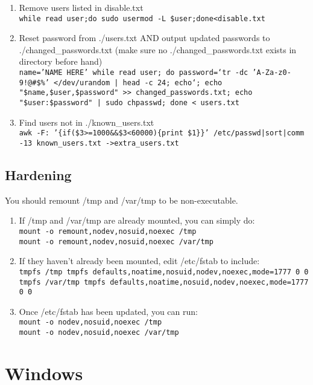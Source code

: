 \documentclass[12pt,letterpaper]{article}
\def\code#1{\textcolor{iris}{\texttt{#1}}}
\begin{document}
\begin{enumerate}
	\item Remove users listed in disable.txt \\
		\code{while read user;do sudo usermod -L \$user;done<disable.txt}
	\item Reset password from ./users.txt AND output updated passwords to ./changed\_passwords.txt (make sure no ./changed\_passwords.txt exists in directory before hand) \\
		\code{name='NAME HERE' while read user; do password=`tr -dc 'A-Za-z0-9!@\#\$\%' </dev/urandom | head -c 24; echo`; echo "\$name,\$user,\$password" >> changed\_passwords.txt; echo "\$user:\$password" | sudo chpasswd; done < users.txt}
	\item Find users not in ./known\_users.txt \\
		\code{awk -F: '\{if(\$3>=1000\&\&\$3<60000)\{print \$1\}\}' /etc/passwd|sort|comm -13 known\_users.txt ->extra\_users.txt}
\end{enumerate}

\subsection{Hardening}

You should remount /tmp and /var/tmp to be non-executable.
\begin{enumerate}
	\item If /tmp and /var/tmp are already mounted, you can simply do: \code{ \\
		mount -o remount,nodev,nosuid,noexec /tmp \\
		mount -o remount,nodev,nosuid,noexec /var/tmp }
	\item If they haven't already been mounted, edit /etc/fstab to include: \code{ \\
		tmpfs /tmp tmpfs defaults,noatime,nosuid,nodev,noexec,mode=1777 0 0 \\
		tmpfs /var/tmp tmpfs defaults,noatime,nosuid,nodev,noexec,mode=1777 0 0 }
	\item Once /etc/fstab has been updated, you can run: \code{ \\
		mount -o nodev,nosuid,noexec /tmp \\
		mount -o nodev,nosuid,noexec /var/tmp }
\end{enumerate}

\pagebreak

\section{Windows}
\end{document}
